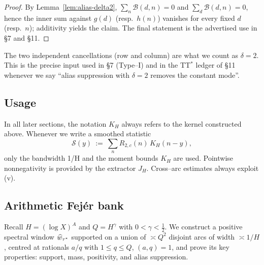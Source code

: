 \begin{proof}
By Lemma~\ref{lem:alias-delta2}, $\sum_n \mathcal{B}(d,n)=0$ and $\sum_d \mathcal{B}(d,n)=0$, hence the inner sum against $g(d)$ (resp.\ $h(n)$) vanishes for every fixed $d$ (resp.\ $n$); additivity yields the claim. The final statement is the advertised use in §7 and §11.
\end{proof}

\begin{remark}[“$\delta=2$” bookkeeping]
The two independent cancellations (row and column) are what we count as $\delta=2$. This is the precise input used in §7 (Type–I) and in the TT$^\ast$ ledger of §11 whenever we say “alias suppression with $\delta=2$ removes the constant mode”.
\end{remark}


\subsection{Usage}

In all later sections, the notation $K_H$ always refers to the kernel
constructed above.  Whenever we write a smoothed statistic
\[
\mathcal S(y)\ :=\ \sum_n R_{2,c}(n)\,K_H(n-y),
\]
only the bandwidth 1/H and the moment bounds $K_H$ are used. Pointwise nonnegativity is provided by the extractor $J_H$. 
Cross--arc estimates always exploit (v).
\qedhere

\subsection{Arithmetic Fej\'er bank}\label{AFB}

Recall $H=(\log X)^A$ and $Q=H^\gamma$ with $0<\gamma<\tfrac12$. We construct a positive spectral window $\widehat w_{\tau^\ast}$ supported on a union of $\asymp Q^2$ disjoint arcs of width $\asymp 1/H$, centred at rationals $a/q$ with $1\le q\le Q$, $(a,q)=1$, and prove its key properties: support, mass, positivity, and alias suppression.

